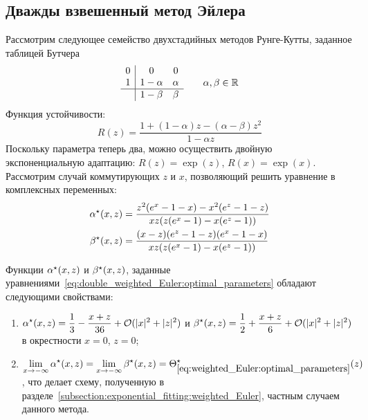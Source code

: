 \subsection{Дважды взвешенный метод Эйлера}
\label{subsection:exponential_fitting:double_weighted_Euler}

Рассмотрим следующее семейство двухстадийных методов Рунге-Кутты,
заданное таблицей Бутчера
\[
    \begin{array}{c|cc}
        0 & 0 & 0 \\
        1 & 1 - \alpha & \alpha \\
        \hline
         & 1 - \beta & \beta
    \end{array}
    \qquad
    \alpha, \beta \in \mathbb{R}
\]
Функция устойчивости:
\[
    R(z) = \frac{1 + (1 - \alpha) z - (\alpha - \beta) z^2}{1 - \alpha z}
\]
Поскольку параметра теперь два,
можно осуществить двойную экспоненциальную адаптацию:
$ R(z) = \exp(z) $, $ R(x) = \exp(x) $.
Рассмотрим случай коммутирующих $ z $ и $ x $,
позволяющий решить уравнение в комплексных переменных:
%
\begin{equation}
    \label{eq:double_weighted_Euler:optimal_parameters}
    \begin{aligned}
        \alpha^\star(x,z) &= \frac{z^2 (e^x - 1 - x) - x^2 (e^z - 1 - z)}{x z( z (e^x - 1) - x (e^z - 1))} \\
        \beta^\star(x,z)  &= \frac{(x-z)(e^z - 1 - z)(e^x - 1 - x)}{x z (z(e^x - 1) - x (e^z - 1))}
    \end{aligned}
\end{equation}
%
\begin{remark}
    \label{remark:double_weighted_Euler:optimal_parameters_properties}
    Функции $ \alpha^\star(x,z) $ и $ \beta^\star(x, z) $,
    заданные уравнениями~\eqref{eq:double_weighted_Euler:optimal_parameters}
    обладают следующими свойствами:
    \begin{enumerate}
        \item $ \displaystyle \alpha^\star(x,z) = \frac{1}{3} - \frac{x + z}{36} + \mathcal{O}(|x|^2 + |z|^2) $
            и $ \displaystyle \beta^\star(x,z)  = \frac{1}{2} + \frac{x + z}{6}  + \mathcal{O}(|x|^2 + |z|^2) $
            в окрестности $ x = 0 $, $ z = 0 $;
        \item $ \displaystyle \lim_{x \to -\infty} \alpha^\star(x,z) =
            \lim_{x \to -\infty} \beta^\star(x,z) = \Theta^\star_{\eqref{eq:weighted_Euler:optimal_parameters}}(z) $,
            что делает схему, полученную в разделе~\ref{subsection:exponential_fitting:weighted_Euler},
            частным случаем данного метода.
    \end{enumerate}
\end{remark}


